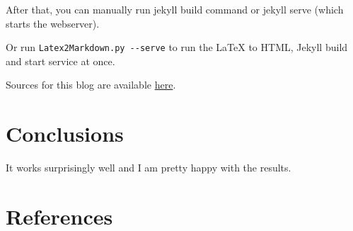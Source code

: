 \documentclass{article}
\begin{document}
After that, you can manually run jekyll build command or jekyll serve (which starts the webserver).

Or run \lstinline{Latex2Markdown.py --serve} to run the LaTeX to HTML, Jekyll build and start service at once.

Sources for this blog are available \href{https://gabrielcarvfer.github.io/Latex2Markdown.py}{here}.

\section{Conclusions}\label{conclusions}
It works surprisingly well and I am pretty happy with the results.

\section{References}


\end{document}
